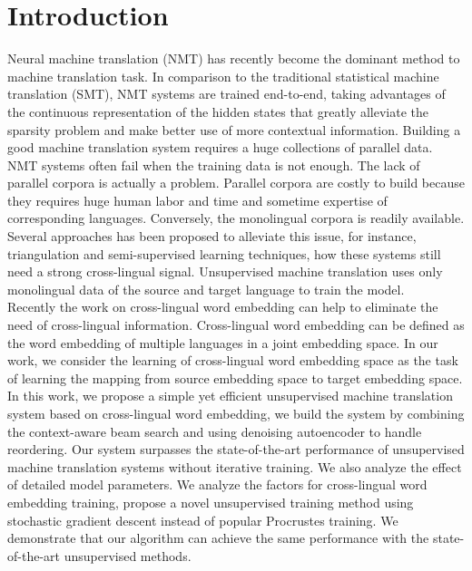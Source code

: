 
\chapter{Introduction}
%

 
Neural machine translation (NMT) has recently become the dominant method to machine translation task. In comparison to the traditional statistical machine translation (SMT), NMT systems are trained end-to-end, taking advantages of the continuous representation of the hidden states that greatly alleviate the sparsity problem and make better use of more contextual information. Building a good machine translation system requires a huge collections of parallel data. NMT systems often fail when the training data is not enough.  The lack of parallel corpora is actually a problem. Parallel corpora are costly to build because they requires huge human labor and time and sometime expertise of corresponding languages. Conversely, the monolingual corpora is readily available.\\
\indent Several approaches has been proposed to alleviate this issue, for instance, triangulation and semi-supervised learning techniques, how these systems still need a strong cross-lingual signal. Unsupervised machine translation uses only monolingual data of the source and target language to train the model.\\
\indent Recently the work on cross-lingual word embedding can help to eliminate the need of cross-lingual information. Cross-lingual word embedding can be defined as the word embedding of multiple languages in a joint embedding space. In our work, we consider the learning of cross-lingual word embedding space as the task of learning the mapping from source embedding space to target embedding space.\\
\indent In this work, we propose a simple yet efficient unsupervised machine translation system based on cross-lingual word embedding, we build the system by combining the context-aware beam search and using denoising autoencoder to handle reordering. Our system surpasses the state-of-the-art performance of unsupervised machine translation systems without iterative training. We also analyze the effect of detailed model parameters. We analyze the factors for cross-lingual word embedding training, propose a novel unsupervised training method using stochastic gradient descent instead of popular Procrustes training. We demonstrate that our algorithm can achieve the same performance with the state-of-the-art unsupervised methods. 

